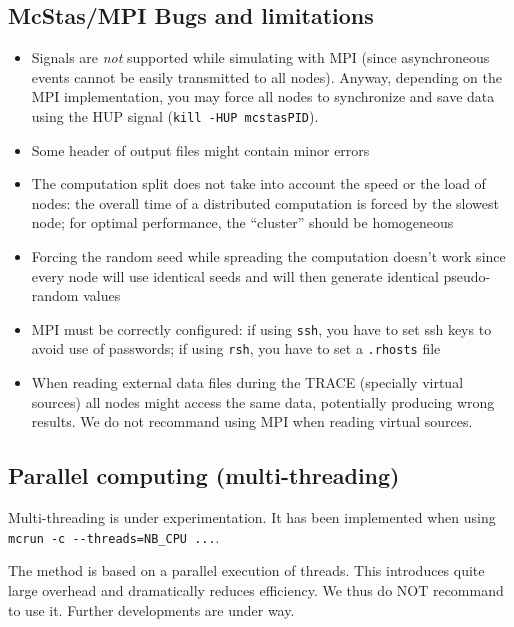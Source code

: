 \subsection{McStas/MPI Bugs and limitations}

\begin{itemize}
\item Signals are \emph{not} supported while simulating with MPI (since
  asynchroneous events cannot be easily transmitted to all nodes). Anyway,
  depending on the MPI implementation, you may force all nodes to synchronize
  and save data using the HUP signal (\verb'kill -HUP mcstasPID').
\item Some header of output files might contain minor errors
\item The computation split does not take into account the speed or the
  load of nodes: the overall time of a distributed computation is
  forced by the slowest node; for optimal performance, the ``cluster''
  should be homogeneous
\item Forcing the random seed while spreading the computation doesn't
  work since every node will use identical seeds and will then
  generate identical pseudo-random values
\item MPI must be correctly configured: if using \verb'ssh', you
  have to set ssh keys to avoid use of passwords; if
  using \verb'rsh', you have to set a \verb'.rhosts' file
\item When reading external data files during the TRACE (specially virtual sources) all nodes might access the same data, potentially producing wrong results. We do not recommand using MPI when reading virtual sources.
\end{itemize}

\subsection{Parallel computing (multi-threading)}

Multi-threading is under experimentation. It has been implemented when using \\\verb+mcrun -c --threads=NB_CPU ...+.

The method is based on a parallel execution of threads. This introduces quite large overhead and dramatically reduces efficiency. We thus do NOT recommand to use it. Further developments are under way.
